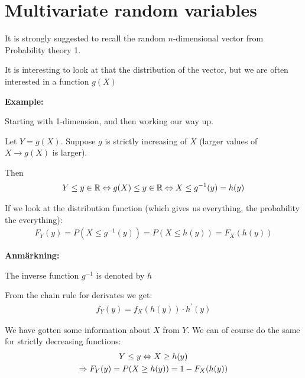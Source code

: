 \section{Multivariate random variables}
\par\bigskip
\noindent It is strongly suggested to recall the random $n$-dimensional vector from Probability theory 1.
\par\bigskip
\noindent It is interesting to look at that the distribution of the vector, but we are often interested in a function $g(X)$
\par\bigskip
\noindent\textbf{Example:}\par
\noindent Starting with 1-dimension, and then working our way up.\par
\noindent Let $Y = g(X)$. Suppose $g$ is strictly increasing of $X$ (larger values of $X\rightarrow g(X)$ is larger).
\par\bigskip
\noindent Then
\begin{equation*}
  \begin{gathered}
    Y\leq y\in\mathbb{R}\Leftrightarrow g(X)\leq y\in\mathbb{R}\Leftrightarrow X\leq g^{-1}(y) = h(y)
  \end{gathered}
\end{equation*}\par
\noindent If we look at the distribution function (which gives us everything, the probability the everything):
\begin{equation*}
  \begin{gathered}
    F_Y(y) = P(X\leq g^{-1}(y)) = P(X\leq h(y)) = F_X(h(y))
  \end{gathered}
\end{equation*}
\par\bigskip
\noindent\textbf{Anmärkning:}\par
\noindent The inverse function $g^{-1}$ is denoted by $h$
\par\bigskip
\noindent From the chain rule for derivates we get:
\begin{equation*}
  \begin{gathered}
    f_Y(y) = f_X(h(y))\cdot h^{\prime}(y)
  \end{gathered}
\end{equation*}
\par\bigskip
\noindent We have gotten some information about $X$ from $Y$. We can of course do the same for strictly decreasing functions:
\begin{equation*}
  \begin{gathered}
    Y\leq y\Leftrightarrow X\geq h(y)\\
    \Rightarrow F_Y(y) = P(X\geq h(y)) = 1-F_X(h(y))
  \end{gathered}
\end{equation*}\par
